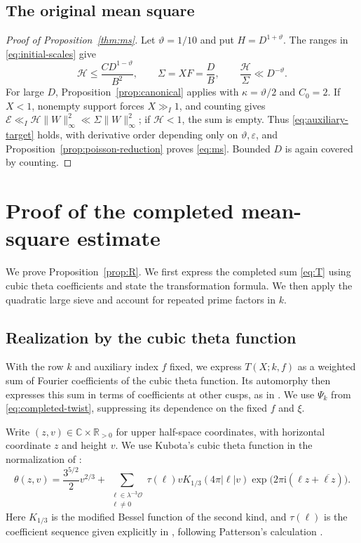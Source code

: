 \documentclass[11pt,a4paper]{article}
\numberwithin{equation}{section}
\numberwithin{figure}{section}
\theoremstyle{definition}
\theoremstyle{remark}
\newcommand{\OO}{\mathcal O}
\newcommand{\E}{\mathcal E}
\begin{document}
\subsection{The original mean square}
\label{sec:completion}
\begin{proof}[Proof of Proposition~\ref{thm:ms}]
Let $\vartheta=1/10$ and put $H=D^{1+\vartheta}$.
The ranges in \eqref{eq:initial-scales} give
\begin{equation}\label{eq:initial-positive-gap}
 \mathcal H\le\frac{CD^{1-\vartheta}}{B^2},\qquad
 \Sigma=XF=\frac DB,\qquad
 \frac{\mathcal H}{\Sigma}\ll D^{-\vartheta}.
\end{equation}
For large $D$, Proposition~\ref{prop:canonical} applies with
$\kappa=\vartheta/2$ and $C_0=2$. If $X<1$, nonempty support forces
$X\gg_I1$, and counting gives $\E\ll_I\mathcal H\|W\|_\infty^2
\ll\Sigma\|W\|_\infty^2$; if $\mathcal H<1$, the sum is empty.
Thus \eqref{eq:auxiliary-target} holds, with derivative order depending
only on $\vartheta,\varepsilon$, and
Proposition~\ref{prop:poisson-reduction} proves \eqref{eq:ms}.
Bounded $D$ is again covered by counting.
\end{proof}


\section{Proof of the completed mean-square estimate}\label{sec:reflection}

We prove Proposition~\ref{prop:R}. We first express the completed sum
\eqref{eq:T} using cubic theta coefficients and state the transformation
formula. We then apply the quadratic large sieve and account for
repeated prime factors in $k$.

\subsection{Realization by the cubic theta function}
With the row $k$ and auxiliary index $f$ fixed, we express
$T(X;k,f)$ as a weighted sum of Fourier coefficients of the cubic theta function.
Its automorphy then expresses this sum in terms of coefficients at
other cusps, as in \cite[\S5 and Appendix~A]{DR}.
We use $\Psi_k$ from \eqref{eq:completed-twist}, suppressing its dependence on the fixed $f$ and $\xi$.

Write $(z,v)\in\mathbb C\times\mathbb R_{>0}$ for upper half-space
coordinates, with horizontal coordinate $z$ and height $v$.
We use Kubota's cubic theta function in the normalization of
\cite[\S5.1, (5.6)]{DR}:
\begin{equation}\label{eq:cubic-theta-definition}
 \theta(z,v)=\frac{3^{5/2}}2v^{2/3}
 +\sum_{\substack{\ell\in\lambda^{-3}\OO\\\ell\ne0}}
 \tau(\ell)vK_{1/3}(4\pi|\ell|v)
 \exp\!\bigl(2\pi\mathrm i(\ell z+\overline{\ell z})\bigr).
\end{equation}
Here $K_{1/3}$ is the modified Bessel function of the second kind,
and $\tau(\ell)$ is the coefficient sequence given explicitly in
\cite[(5.7)--(5.8)]{DR}, following Patterson's calculation
\cite[Theorem~8.1]{Pat77}.
\end{document}
